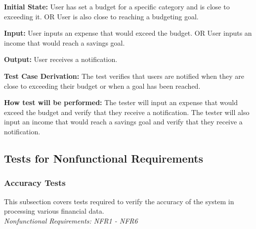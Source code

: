 \documentclass[12pt, titlepage]{article}
\begin{document}
\begin{enumerate}
\textbf{Initial State:} User has set a budget for a specific category and is
close to exceeding it. OR User is also close to reaching a budgeting goal.

\textbf{Input:} User inputs an expense that would exceed the budget. OR User
inputs an income that would reach a savings goal.

\textbf{Output:} User receives a notification.

\textbf{Test Case Derivation:} The test verifies that users are notified when
they are close to exceeding their budget or when a goal has been reached.

\textbf{How test will be performed:} The tester will input an expense that would
exceed the budget and verify that they receive a notification. The tester will
also input an income that would reach a savings goal and verify that they receive
a notification.

\end{enumerate}

\subsection{Tests for Nonfunctional Requirements}

\subsubsection{Accuracy Tests}

This subsection covers tests required to verify the accuracy of the system in processing various financial data.\\
\textit{Nonfunctional Requirements: NFR1 - NFR6}
\end{document}
